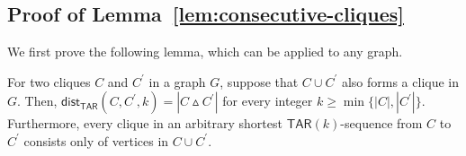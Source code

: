 \documentclass{llncs}
\newcommand{\TAR}[1]{\mathsf{TAR}(#1)}
\newcommand{\symdiff}[2]{#1 \vartriangle #2}
\newcommand{\cliq}{C}
\newcommand{\distTAR}[3]{\mathsf{dist_{TAR}}(#1,#2,#3)}
\newcounter{one}
\newcounter{two}
\begin{document}
	\subsection{Proof of Lemma~\ref{lem:consecutive-cliques}} \label{app:oneclique}
	We first prove the following lemma, which can be applied to any graph. 
	\begin{lemma} \label{lem:tar-dist-in-a-clique}
	For two cliques $\cliq$ and $\cliq^\prime$ in a graph $G$, suppose that $\cliq \cup \cliq^\prime$ also forms a clique in $G$.
	Then, $\distTAR{\cliq}{\cliq^\prime}{k} = |\symdiff{\cliq}{\cliq^\prime}|$ for every integer $k \ge \min\{|\cliq|, |\cliq^\prime|\}$.
	Furthermore,  every clique in an arbitrary shortest $\TAR{k}$-sequence from $\cliq$ to $\cliq^\prime$ consists only of vertices in $\cliq \cup \cliq^\prime$.
	\end{lemma}
\end{document}
